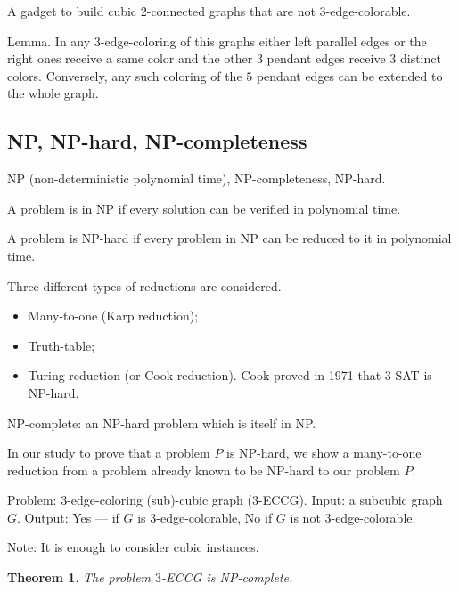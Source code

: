 \documentclass[12pt,a4paper]{article}
\newtheorem{theorem}{Theorem}
\begin{document}
A gadget to build cubic \(2\)-connected graphs that are not
\(3\)-edge-colorable.

Lemma. In any \(3\)-edge-coloring of this graphs either left parallel edges or
the right ones receive a same color and the other \(3\) pendant edges receive
\(3\) distinct colors. Conversely, any such coloring of the \(5\) pendant edges
can be extended to the whole graph.

\subsection{NP, NP-hard, NP-completeness}

NP (non-deterministic polynomial time), NP-completeness, NP-hard.

A problem is in NP if every solution can be verified in polynomial time.

A problem is NP-hard if every problem in NP can be reduced to it in polynomial
time.

Three different types of reductions are considered.
\begin{itemize}
\item Many-to-one (Karp reduction);
\item Truth-table;
\item Turing reduction (or Cook-reduction). Cook proved in 1971 that \(3\)-SAT
  is NP-hard.
\end{itemize}

NP-complete: an NP-hard problem which is itself in NP.\@

In our study to prove that a problem \(P\) is NP-hard, we show a many-to-one
reduction from a problem already known to be NP-hard to our problem \(P\).

Problem: \(3\)-edge-coloring (sub)-cubic graph (\(3\)-ECCG).
Input: a subcubic graph \(G\).
Output: Yes --- if \(G\) is \(3\)-edge-colorable, No if \(G\) is not
\(3\)-edge-colorable.

Note: It is enough to consider cubic instances.

\begin{theorem}
  The problem \(3\)-ECCG is NP-complete.
\end{theorem}
\end{document}
